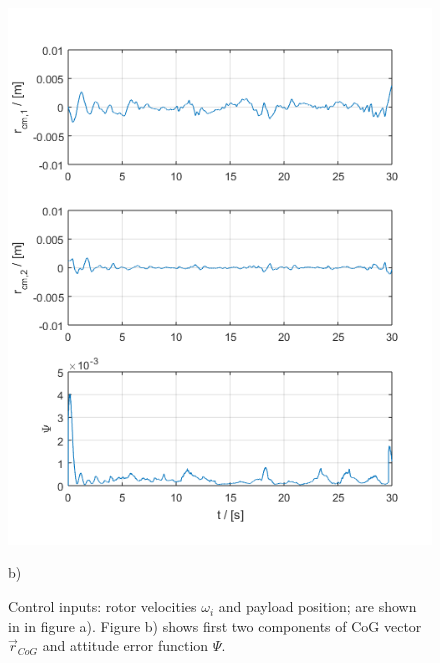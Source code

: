 \begin{figure}[h!]
\begin{minipage}{0.5\columnwidth}
		\includegraphics[width=\columnwidth]{./pictures/manip_traj_rcmPsi.png}
		\caption*{b)}
		\label{fig:manip_rcm}
	\end{minipage}
	\caption{Control inputs: rotor velocities $\omega_i$ and payload position; are shown in in figure a). Figure b) shows first two components of CoG vector $\vec{r}_{CoG}$ and attitude error function $\Psi$.}
\end{figure}
